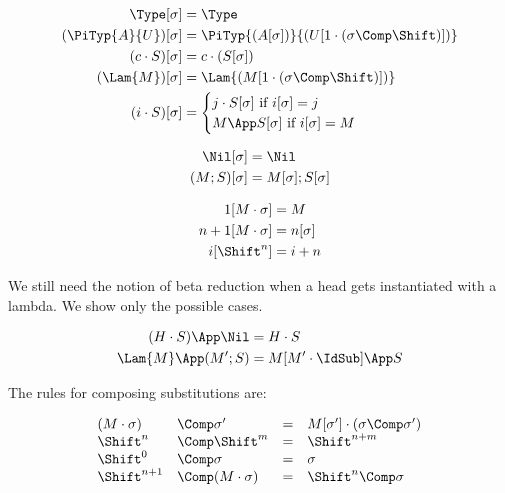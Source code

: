 \bigskip
{}

\begin{align*} 
\Type\Msub &= \Type \\
(\PiTyp{A}{U})\Msub &= \PiTyp{(A\Msub)}{(U\Ssub)}\\
(c\cdot S)\Msub &= c\cdot (S\Msub) \\
(\Lam{M})\Msub &= \Lam{(M\Ssub)}\\
(i\cdot S)\Msub &= \begin{cases}
                     j\cdot S\Msub \mbox{\ if $i\Msub = j$} \\
                     M \App S\Msub\mbox{\ if $i\Msub = M$}
                   \end{cases} 
\end{align*} 




\begin{align*} 
\Nil\Msub &= \Nil\\
(M;S)\Msub &= M\Msub;S\Msub
\end{align*} 


\begin{align*} 
1[M\cdot\sigma] &= M\\
n+1[M\cdot\sigma] &= n[\sigma]\\
i[\Shift^n] &= i+n\\
\end{align*} 

We still need the notion of beta reduction when a 
head gets instantiated with a lambda.  We show
only the possible cases.

\bigskip 
{}

\begin{align*} 
(H\cdot S)\App\Nil &= H\cdot S\\
\Lam{M}\App(M';S) &= M[M'\cdot\IdSub]\App S
\end{align*} 

The rules for composing substitutions are:

\bigskip 
{}

$$
\begin{array}{llll}
(M\cdot \sigma) & \Comp \sigma' &= &M[\sigma']\cdot (\sigma\Comp\sigma') \\
\Shift^n & \Comp \Shift^m &= &\Shift^{n+m}\\
\Shift^0 & \Comp \sigma &= &\sigma\\
\Shift^{n+1}&\Comp (M\cdot\sigma) &= &\Shift^n\Comp\sigma
\end{array} 
$$

